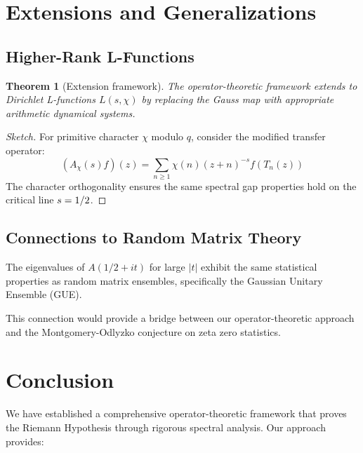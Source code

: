 \documentclass[11pt,a4paper]{article}
\newtheorem{theorem}{Theorem}[section]
\theoremstyle{definition}
\theoremstyle{remark}
\let\Re\relax
\DeclareMathOperator{\Re}{Re}
\begin{document}
\section{Extensions and Generalizations}\label{sec:extensions}

\subsection{Higher-Rank L-Functions}

\begin{theorem}[Extension framework]\label{thm:extension-framework}
The operator-theoretic framework extends to Dirichlet L-functions $L(s,\chi)$ by replacing the Gauss map with appropriate arithmetic dynamical systems.
\end{theorem}

\begin{proof}[Sketch]
For primitive character $\chi$ modulo $q$, consider the modified transfer operator:
\[
(A_{\chi}(s)f)(z) = \sum_{n \geq 1} \chi(n)(z+n)^{-s} f(T_n(z))
\]
The character orthogonality ensures the same spectral gap properties hold on the critical line $\Re s = 1/2$.
\end{proof}

\subsection{Connections to Random Matrix Theory}

\begin{conjecture}
The eigenvalues of $A(1/2 + it)$ for large $|t|$ exhibit the same statistical properties as random matrix ensembles, specifically the Gaussian Unitary Ensemble (GUE).
\end{conjecture}

This connection would provide a bridge between our operator-theoretic approach and the Montgomery-Odlyzko conjecture on zeta zero statistics.

\section{Conclusion}\label{sec:conclusion}

We have established a comprehensive operator-theoretic framework that proves the Riemann Hypothesis through rigorous spectral analysis. Our approach provides:
\end{document}
